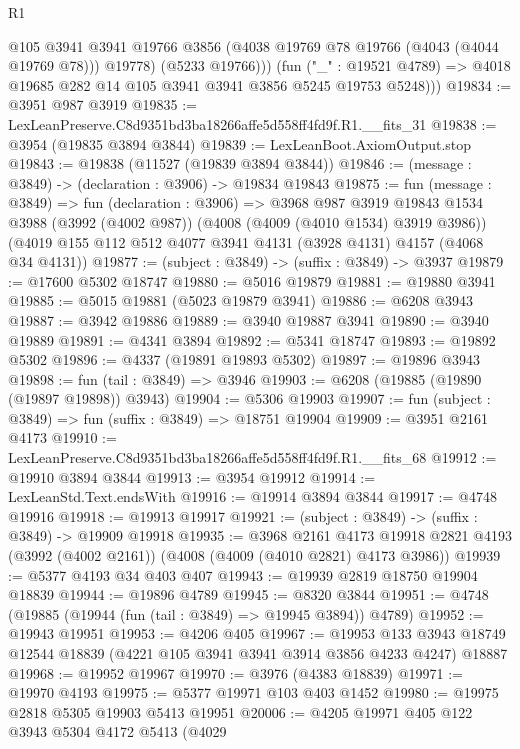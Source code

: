 \begin{lexlean}{R1}
\begin{coremodule}
              @105
              @3941
              @3941
              @19766
              @3856
              (@4038 @19769 @78 @19766 (@4043 (@4044 @19769 @78)))
              @19778)
            (@5233 @19766)))
        (fun ("_" : @19521 @4789) =>
        @4018 @19685 @282 @14 @105 @3941 @3941 @3856 @5245 @19753 @5248)))
@19834 := @3951 @987 @3919
@19835 := LexLeanPreserve.C8d9351bd3ba18266affe5d558ff4fd9f.R1.__fits_31
@19838 := @3954 (@19835 @3894 @3844)
@19839 := LexLeanBoot.AxiomOutput.stop
@19843 := @19838 (@11527 (@19839 @3894 @3844))
@19846 := (message : @3849) -> (declaration : @3906) -> @19834 @19843
@19875 := fun (message : @3849) =>
  fun (declaration : @3906) =>
  @3968
    @987
    @3919
    @19843
    @1534
    @3988
    (@3992 (@4002 @987))
    (@4008 (@4009 (@4010 @1534) @3919 @3986))
    (@4019 @155 @112 @512 @4077 @3941 @4131 (@3928 @4131) @4157 (@4068 @34 @4131))
@19877 := (subject : @3849) -> (suffix : @3849) -> @3937
@19879 := @17600 @5302 @18747
@19880 := @5016 @19879
@19881 := @19880 @3941
@19885 := @5015 @19881 (@5023 @19879 @3941)
@19886 := @6208 @3943
@19887 := @3942 @19886
@19889 := @3940 @19887 @3941
@19890 := @3940 @19889
@19891 := @4341 @3894
@19892 := @5341 @18747
@19893 := @19892 @5302
@19896 := @4337 (@19891 @19893 @5302)
@19897 := @19896 @3943
@19898 := fun (tail : @3849) => @3946
@19903 := @6208 (@19885 (@19890 (@19897 @19898)) @3943)
@19904 := @5306 @19903
@19907 := fun (subject : @3849) => fun (suffix : @3849) => @18751 @19904
@19909 := @3951 @2161 @4173
@19910 := LexLeanPreserve.C8d9351bd3ba18266affe5d558ff4fd9f.R1.__fits_68
@19912 := @19910 @3894 @3844
@19913 := @3954 @19912
@19914 := LexLeanStd.Text.endsWith
@19916 := @19914 @3894 @3844
@19917 := @4748 @19916
@19918 := @19913 @19917
@19921 := (subject : @3849) -> (suffix : @3849) -> @19909 @19918
@19935 := @3968
    @2161
    @4173
    @19918
    @2821
    @4193
    (@3992 (@4002 @2161))
    (@4008 (@4009 (@4010 @2821) @4173 @3986))
@19939 := @5377 @4193 @34 @403 @407
@19943 := @19939 @2819 @18750 @19904 @18839
@19944 := @19896 @4789
@19945 := @8320 @3844
@19951 := @4748 (@19885 (@19944 (fun (tail : @3849) => @19945 @3894)) @4789)
@19952 := @19943 @19951
@19953 := @4206 @405
@19967 := @19953
    @133
    @3943
    @18749
    @12544
    @18839
    (@4221 @105 @3941 @3941 @3914 @3856 @4233 @4247)
    @18887
@19968 := @19952 @19967
@19970 := @3976 (@4383 @18839)
@19971 := @19970 @4193
@19975 := @5377 @19971 @103 @403 @1452
@19980 := @19975 @2818 @5305 @19903 @5413 @19951
@20006 := @4205
    @19971
    @405
    @122
    @3943
    @5304
    @4172
    @5413
    (@4029

\end{coremodule}
\end{lexlean}
